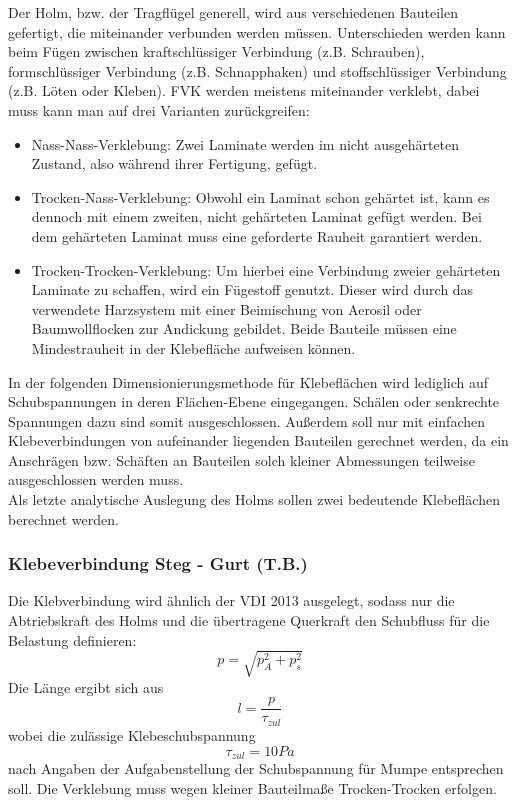 Der Holm, bzw. der Tragflügel generell, wird aus verschiedenen Bauteilen gefertigt, die miteinander verbunden werden müssen. Unterschieden werden kann beim Fügen zwischen kraftschlüssiger Verbindung (z.B. Schrauben), formschlüssiger Verbindung (z.B. Schnapphaken) und stoffschlüssiger Verbindung (z.B. Löten oder Kleben). FVK werden meistens miteinander verklebt, dabei muss kann man auf drei Varianten zurückgreifen:
\begin{itemize}
	\item Nass-Nass-Verklebung: Zwei Laminate werden im nicht ausgehärteten Zustand, also während ihrer Fertigung, gefügt.
	\item Trocken-Nass-Verklebung: Obwohl ein Laminat schon gehärtet ist, kann es dennoch mit einem zweiten, nicht gehärteten Laminat gefügt werden. Bei dem gehärteten Laminat muss eine geforderte Rauheit garantiert werden.
	\item Trocken-Trocken-Verklebung: Um hierbei eine Verbindung zweier gehärteten Laminate zu schaffen, wird ein Fügestoff genutzt. Dieser wird durch das verwendete Harzsystem mit einer Beimischung von Aerosil oder Baumwollflocken zur Andickung gebildet. Beide Bauteile müssen eine Mindestrauheit in der Klebefläche aufweisen können.
\end{itemize}

\noindent In der folgenden Dimensionierungsmethode für Klebeflächen wird lediglich auf Schubspannungen in deren Flächen-Ebene eingegangen. Schälen oder senkrechte Spannungen dazu sind somit ausgeschlossen. Außerdem soll nur mit einfachen Klebeverbindungen von aufeinander liegenden Bauteilen gerechnet werden, da ein Anschrägen bzw. Schäften an Bauteilen solch kleiner Abmessungen teilweise ausgeschlossen werden muss.\\

\noindent Als letzte analytische Auslegung des Holms sollen zwei bedeutende Klebeflächen berechnet werden.
\subsubsection{Klebeverbindung Steg - Gurt (T.B.)}
Die Klebverbindung wird ähnlich der VDI 2013 ausgelegt, sodass nur die Abtriebskraft des Holms und die übertragene Querkraft den Schubfluss für die Belastung definieren:
\begin{equation}
	p=\sqrt{p_{A}^{2}+p_{s}^{2}}
\end{equation}
Die Länge ergibt sich aus 
\begin{equation}
	l=\frac{p}{\tau_{zul}}
\end{equation}
wobei die zulässige Klebeschubspannung
\begin{equation}
	\tau_{zul}=10 Pa
\end{equation}
nach Angaben der Aufgabenstellung der Schubspannung für Mumpe entsprechen soll. Die Verklebung muss wegen kleiner Bauteilmaße \glqq Trocken-Trocken\grqq\: erfolgen.\\

